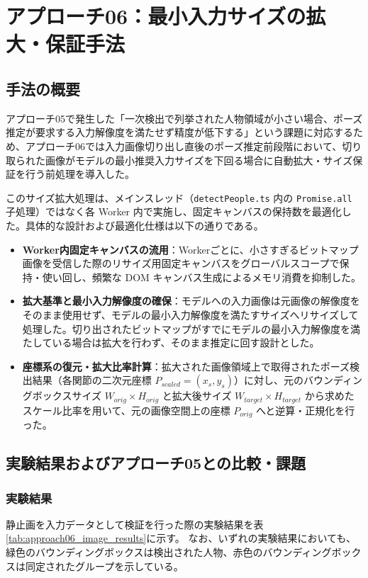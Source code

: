 \section{アプローチ06：最小入力サイズの拡大・保証手法}

\subsection{手法の概要}
アプローチ05で発生した「一次検出で列挙された人物領域が小さい場合、ポーズ推定が要求する入力解像度を満たせず精度が低下する」という課題に対応するため、アプローチ06では入力画像切り出し直後のポーズ推定前段階において、切り取られた画像がモデルの最小推奨入力サイズを下回る場合に自動拡大・サイズ保証を行う前処理を導入した。

このサイズ拡大処理は、メインスレッド（\texttt{detectPeople.ts} 内の \texttt{Promise.all} 子処理）ではなく各 Worker 内で実施し、固定キャンバスの保持数を最適化した。具体的な設計および最適化仕様は以下の通りである。

\begin{itemize}
    \item \textbf{Worker内固定キャンバスの流用}：Workerごとに、小さすぎるビットマップ画像を受信した際のリサイズ用固定キャンバスをグローバルスコープで保持・使い回し、頻繁な DOM キャンバス生成によるメモリ消費を抑制した。
    \item \textbf{拡大基準と最小入力解像度の確保}：モデルへの入力画像は元画像の解像度をそのまま使用せず、モデルの最小入力解像度を満たすサイズへリサイズして処理した。切り出されたビットマップがすでにモデルの最小入力解像度を満たしている場合は拡大を行わず、そのまま推定に回す設計とした。
    \item \textbf{座標系の復元・拡大比率計算}：拡大された画像領域上で取得されたポーズ検出結果（各関節の二次元座標 $P_{scaled} = (x_{s}, y_{s})$）に対し、元のバウンディングボックスサイズ $W_{orig} \times H_{orig}$ と拡大後サイズ $W_{target} \times H_{target}$ から求めたスケール比率を用いて、元の画像空間上の座標 $P_{orig}$ へと逆算・正規化を行った。
\end{itemize}

\subsection{実験結果およびアプローチ05との比較・課題}

\subsubsection{実験結果}
静止画を入力データとして検証を行った際の実験結果を表\ref{tab:approach06_image_results}に示す。
なお、いずれの実験結果においても、緑色のバウンディングボックスは検出された人物、赤色のバウンディングボックスは同定されたグループを示している。

